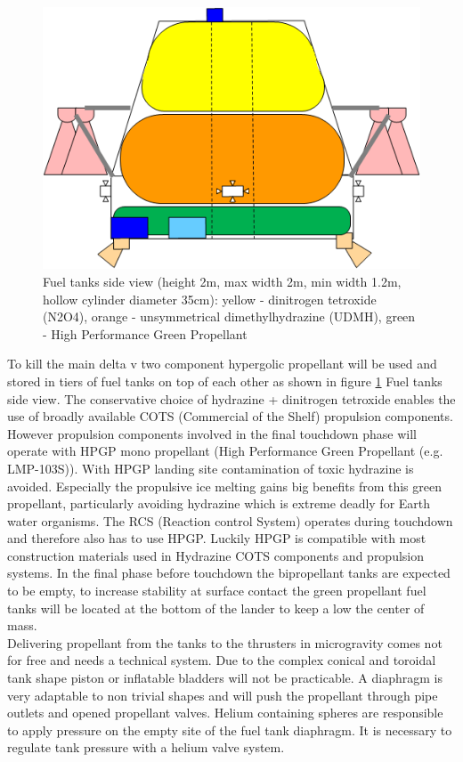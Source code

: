 \begin{figure}[htb]
	\centering
	\includegraphics[width=\textwidth]{Lander/aaronfueltank}
	\caption{Fuel tanks side view (height 2m, max width 2m, min width 1.2m, hollow cylinder diameter 35cm): yellow - dinitrogen tetroxide (N2O4), orange - unsymmetrical dimethylhydrazine (UDMH), green - High Performance Green Propellant \label{fig:afuelTank}}
\end{figure}

To kill the main delta v two component hypergolic propellant will be used and stored in tiers of fuel tanks on top of each other as shown in figure \ref{fig:afuelTank} Fuel tanks side view. The conservative choice of hydrazine + dinitrogen tetroxide enables the  use of broadly available COTS (Commercial of the Shelf) propulsion components. However propulsion components involved in the final touchdown phase will operate with HPGP mono propellant (High Performance Green Propellant (e.g. LMP-103S)). With HPGP landing site contamination of toxic hydrazine is avoided. Especially the propulsive ice melting gains big benefits from this green propellant, particularly avoiding hydrazine which is extreme deadly for Earth water organisms. The RCS (Reaction control System) operates during touchdown and therefore also has to use HPGP. Luckily HPGP is compatible with most construction materials used in Hydrazine COTS components and propulsion systems. In the final phase before touchdown the bipropellant tanks are expected to be empty, to increase stability at surface contact the green propellant fuel tanks will be located at the bottom of the lander to keep a low the center of mass.\\
Delivering propellant from the tanks to the thrusters in microgravity comes not for free and needs a technical system. Due to the complex conical and toroidal tank shape piston or inflatable bladders will not be practicable. A diaphragm is very adaptable to non trivial shapes and will push the propellant through pipe outlets and opened propellant valves. Helium containing spheres  are responsible to apply pressure on the empty site of the fuel tank diaphragm. It is necessary to regulate tank pressure with a helium valve system.\\

